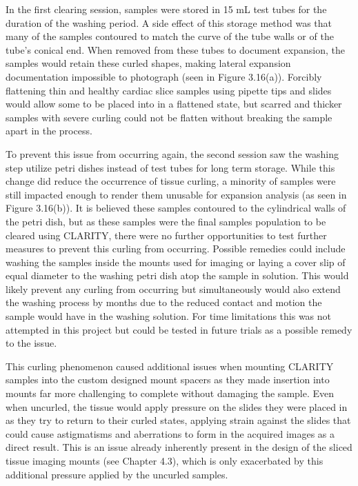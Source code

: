     
In the first clearing session, samples were stored in 15 mL test tubes for the duration of the washing period. A side effect of this storage method was that many of the samples contoured to match the curve of the tube walls or of the tube's conical end. When removed from these tubes to document expansion, the samples would retain these curled shapes, making lateral expansion documentation impossible to photograph (seen in Figure 3.16(a)). Forcibly flattening thin and healthy cardiac slice samples using pipette tips and slides would allow some to be placed into in a flattened state, but scarred and thicker samples with severe curling could not be flatten without breaking the sample apart in the process.  

To prevent this issue from occurring again, the second session saw the washing step utilize petri dishes instead of test tubes for long term storage. While this change did reduce the occurrence of tissue curling, a minority of samples were still impacted enough to render them unusable for expansion analysis (as seen in Figure 3.16(b)). It is believed these samples contoured to the cylindrical walls of the petri dish, but as these samples were the final samples population to be cleared using CLARITY, there were no further opportunities to test further measures to prevent this curling from occurring. Possible remedies could include washing the samples inside the mounts used for imaging or laying a cover slip of equal diameter to the washing petri dish atop the sample in solution. This would likely prevent any curling from occurring but simultaneously would also extend the washing process by months due to the reduced contact and motion the sample would have in the washing solution. For time limitations this was not attempted in this project but could be tested in future trials as a possible remedy to the issue.

This curling phenomenon caused additional issues when mounting CLARITY samples into the custom designed mount spacers as they made insertion into mounts far more challenging to complete without damaging the sample. Even when uncurled, the tissue would apply pressure on the slides they were placed in as they try to return to their curled states, applying strain against the slides that could cause astigmatisms and aberrations to form in the acquired images as a direct result. This is an issue already inherently present in the design of the sliced tissue imaging mounts (see Chapter 4.3), which is only exacerbated by this additional pressure applied by the uncurled samples. 

